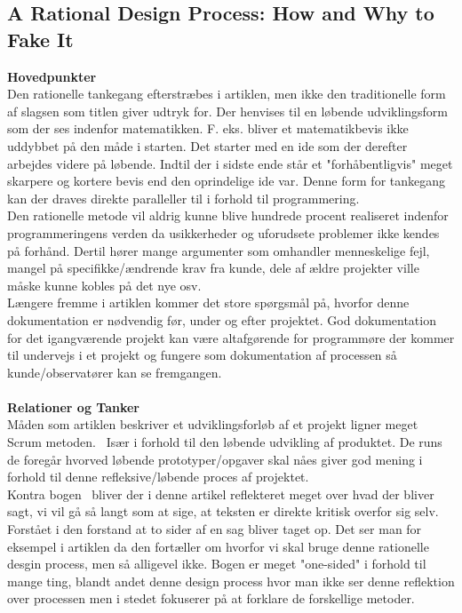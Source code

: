 \documentclass[a4paper]{article}
\begin{document}
\subsection{A Rational Design Process: How and Why to Fake It}
\textbf{Hovedpunkter}\\
Den rationelle tankegang efterstræbes i artiklen, men ikke den traditionelle form af slagsen som titlen giver udtryk for.
Der henvises til en løbende udviklingsform som der ses indenfor matematikken.
F. eks. bliver et matematikbevis ikke uddybbet på den måde i starten. Det starter med en ide som der derefter arbejdes videre på løbende. Indtil der i sidste ende står et "forhåbentligvis" meget skarpere og kortere bevis end den oprindelige ide var.
Denne form for tankegang kan der draves direkte paralleller til i forhold til programmering.\\
Den rationelle metode vil aldrig kunne blive hundrede procent realiseret indenfor programmeringens verden da usikkerheder og uforudsete problemer ikke kendes på forhånd. Dertil hører mange argumenter som omhandler menneskelige fejl, mangel på specifikke/ændrende krav fra kunde, dele af ældre projekter ville måske kunne kobles på det nye osv.\\
Længere fremme i artiklen kommer det store spørgsmål på, hvorfor denne dokumentation er nødvendig før, under og efter projektet. God dokumentation for det igangværende projekt kan være altafgørende for programmøre der kommer til undervejs i et projekt og fungere som dokumentation af processen så kunde/observatører kan se fremgangen.\\\\
\textbf{Relationer og Tanker}\\
Måden som artiklen beskriver et udviklingsforløb af et projekt ligner meget Scrum metoden.~\cite{Scrum} Især i forhold til den løbende udvikling af produktet. De runs de foregår hvorved løbende prototyper/opgaver skal nåes giver god mening i forhold til denne refleksive/løbende proces af projektet.\\
Kontra bogen~\cite{OOSE} bliver der i denne artikel reflekteret meget over hvad der bliver sagt, vi vil gå så langt som at sige, at teksten er direkte kritisk overfor sig selv. Forstået i den forstand at to sider af en sag bliver taget op. Det ser man for eksempel i artiklen da den fortæller om hvorfor vi skal bruge denne rationelle desgin process, men så alligevel ikke. Bogen er meget "one-sided" i forhold til mange ting, blandt andet denne design process hvor man ikke ser denne reflektion over processen men i stedet fokuserer på at forklare de forskellige metoder.\\
\pagebreak
\end{document}
